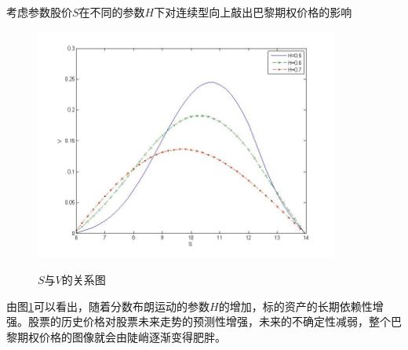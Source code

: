 \documentclass{ctexart} %
\begin{document}
考虑参数股价$S$在不同的参数$H$下对连续型向上敲出巴黎期权价格的影响
\begin{figure}[H]
\begin{center}
\label{paris_fbm}
\includegraphics[width=10cm]{code/paris_fbm.jpg}
\caption{$S$与$V$的关系图}
\end{center}
\end{figure}
由图\ref{paris_fbm}可以看出，随着分数布朗运动的参数$H$的增加，标的资产的长期依赖性增强。股票的历史价格对股票未来走势的预测性增强，未来的不确定性减弱，整个巴黎期权价格的图像就会由陡峭逐渐变得肥胖。
\fi
\end{document}
